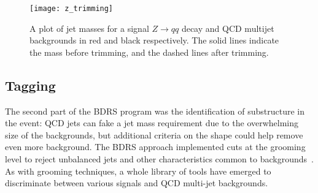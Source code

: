 
\begin{figure}
\centering
\texttt{[image: z\_trimming]}
\label{fig:jets:z_trimming}
\caption{A plot of jet masses for a signal $Z\rightarrow qq$ decay and QCD multijet backgrounds in red and black respectively. The solid lines indicate the mass before trimming, and the dashed lines after trimming.}
\end{figure}



\subsection{Tagging}

The second part of the BDRS program was the identification of substructure in the event: QCD jets can fake a jet mass requirement due to the overwhelming size of the backgrounds, but additional criteria on the shape could help remove even more background. The BDRS approach implemented cuts at the grooming level to reject unbalanced jets and other characteristics common to backgrounds~\cite{BDRS}. As with grooming techniques, a whole library of tools have emerged to discriminate between various signals and QCD multi-jet backgrounds. 

